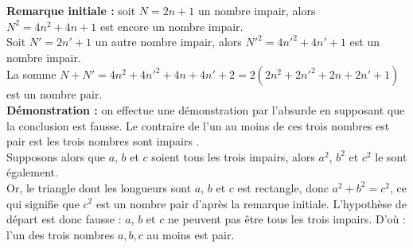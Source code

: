    {\bf Remarque initiale :} soit $N =2n+1$ un nombre impair, alors $N^2 =4n^2+4n+1$ est encore un nombre impair. \\
   Soit $N'=2n'+1$ un autre nombre impair, alors $N'^2 =4n'^2+4n'+1$ est un nombre impair. \\
   La somme $N+N'=4n^2+4n'^2+4n+4n'+2 =2(2n^2+2n'^2+2n+2n'+1)$ est un nombre pair. \\ [2mm]
   {\bf Démonstration :} on effectue une démonstration par l'absurde en supposant que la conclusion est fausse. Le contraire de \og l’un au moins de ces trois nombres est pair \fg{} est \og les trois nombres sont impairs \fg. \\
   Supposons alors que $a$, $b$ et $c$ soient tous les trois impairs, alors $a^2$, $b^2$ et $c^2$ le sont également. \\
   Or, le triangle dont les longueurs sont $a$, $b$ et $c$ est rectangle, donc $a^2 + b^2 = c^2$, ce qui signifie que $c^2$ est un nombre pair d'après la remarque initiale. L'hypothèse de départ est donc fausse : $a$, $b$ et $c$ ne peuvent pas être tous les trois impairs. D'où : {\blue l'un des trois nombres $a, b, c$ au moins est pair.}
